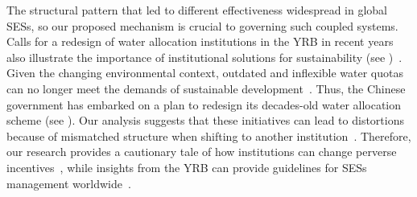 The structural pattern that led to different effectiveness widespread in global SESs, so our proposed mechanism is crucial to governing such coupled systems.
Calls for a redesign of water allocation institutions in the YRB in recent years also illustrate the importance of institutional solutions for sustainability (see \textit{})~\cite{yu2019, niu2022}.
Given the changing environmental context, outdated and inflexible water quotas can no longer meet the demands of sustainable development~\cite{wang2019a}.
Thus, the Chinese government has embarked on a plan to redesign its decades-old water allocation scheme (see \textit{}).
Our analysis suggests that these initiatives can lead to distortions because of mismatched structure when shifting to another institution~\cite{bodin2017b}.
Therefore, our research provides a cautionary tale of how institutions can change perverse incentives~\cite{hegwood2022}, while insights from the YRB can provide guidelines for SESs management worldwide~\cite{muneepeerakul2017, leslie2015}.
